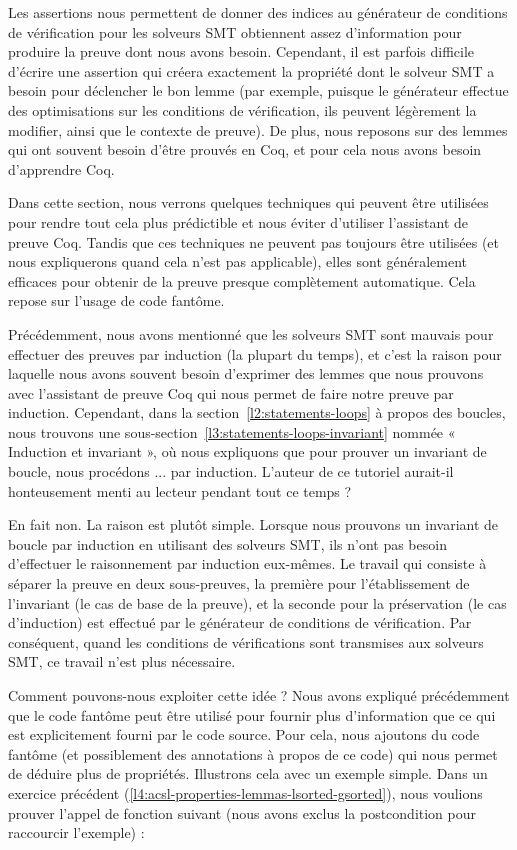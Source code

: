 Les assertions nous permettent de donner des indices au générateur
de conditions de vérification pour les solveurs SMT obtiennent assez d'information
pour produire la preuve dont nous avons besoin. Cependant, il est parfois
difficile d'écrire une assertion qui créera exactement la propriété dont le
solveur SMT a besoin pour déclencher le bon lemme (par exemple, puisque le
générateur effectue des optimisations sur les conditions de vérification, ils peuvent
légèrement la modifier, ainsi que le contexte de preuve). De plus, nous
reposons sur des lemmes qui ont souvent besoin d'être prouvés en Coq, et pour
cela nous avons besoin d'apprendre Coq.


Dans cette section, nous verrons quelques techniques qui peuvent être
utilisées pour rendre tout cela plus prédictible et nous éviter d'utiliser
l'assistant de preuve Coq. Tandis que ces techniques ne peuvent pas toujours
être utilisées (et nous expliquerons quand cela n'est pas applicable), elles
sont généralement efficaces pour obtenir de la preuve presque complètement
automatique. Cela repose sur l'usage de code fantôme.




Précédemment, nous avons mentionné que les solveurs SMT sont mauvais pour
effectuer des preuves par induction (la plupart du temps), et c'est la raison
pour laquelle nous avons souvent besoin d'exprimer des lemmes que nous prouvons
avec l'assistant de preuve Coq qui nous permet de faire notre preuve par
induction. Cependant, dans la section~\ref{l2:statements-loops} à propos des
boucles, nous trouvons une sous-section~\ref{l3:statements-loops-invariant}
nommée « Induction et invariant », où nous expliquons que pour prouver un
invariant de boucle, nous procédons ... par induction. L'auteur de ce tutoriel
aurait-il honteusement menti au lecteur pendant tout ce temps ?


En fait non. La raison est plutôt simple. Lorsque nous prouvons un
invariant de boucle par induction en utilisant des solveurs SMT, ils n'ont pas
besoin d'effectuer le raisonnement par induction eux-mêmes. Le travail qui
consiste à séparer la preuve en deux sous-preuves, la première pour
l'établissement de l'invariant (le cas de base de la preuve), et la seconde pour
la préservation (le cas d'induction) est effectué par le générateur
de conditions de vérification. Par conséquent, quand les conditions de vérifications sont
transmises aux solveurs SMT, ce travail n'est plus nécessaire.


Comment pouvons-nous exploiter cette idée ? Nous avons expliqué précédemment
que le code fantôme peut être utilisé pour fournir plus d'information que ce qui
est explicitement fourni par le code source. Pour cela, nous ajoutons du code
fantôme (et possiblement des annotations à propos de ce code) qui nous permet
de déduire plus de propriétés. Illustrons cela avec un exemple simple. Dans
un exercice précédent (\ref{l4:acsl-properties-lemmas-lsorted-gsorted}), nous
voulions prouver l'appel de fonction suivant (nous avons exclus la
postcondition pour raccourcir l'exemple) :


